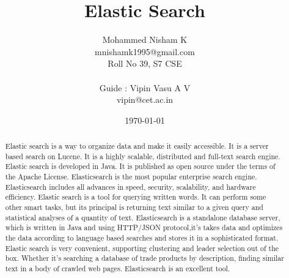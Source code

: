 \documentclass[a4paper,10pt]{article}
\title{\Huge {\textbf {Elastic Search}}}
\author{
  \Large { Mohammed Nisham K } \\
  mnishamk1995@gmail.com \\
  \small Roll No 39, S7 CSE \\
  \\
  \Large {Guide : Vipin Vasu A V}\\
  vipin@cet.ac.in
}
\date{\today}
\begin{document}
\maketitle
\nocite{*}

\renewcommand{\abstractname}{\Large Abstract}
\begin{abstract}
Elastic search is a way to organize data and make it easily accessible. 
It is a server  based search on Lucene. It is a highly scalable, distributed and full-text search engine. 
Elastic search is developed in Java. It is published as open source under the terms of the Apache License. 
Elasticsearch is the most popular enterprise search engine. Elasticsearch includes all advances in speed, security, 
scalability, and hardware efficiency. Elastic search is a tool for querying written words. It can perform some other 
smart tasks, but its principal is returning text similar to a given query and statistical analyses of a quantity of text. 
Elasticsearch is a standalone database server,  which  is  written  in  Java and using HTTP/JSON protocol,it’s  takes  data  
and  optimizes  the  data  according  to  language  based searches and stores it in a sophisticated format. 
Elastic search is very convenient, supporting clustering and leader selection out of the box.  
Whether  it’s  searching  a  database  of  trade  products  by  description,  finding  similar  text  in  a  body  of  
crawled  web  pages. Elasticsearch is an excellent tool. 
\end{abstract}

{}

\end{document}
